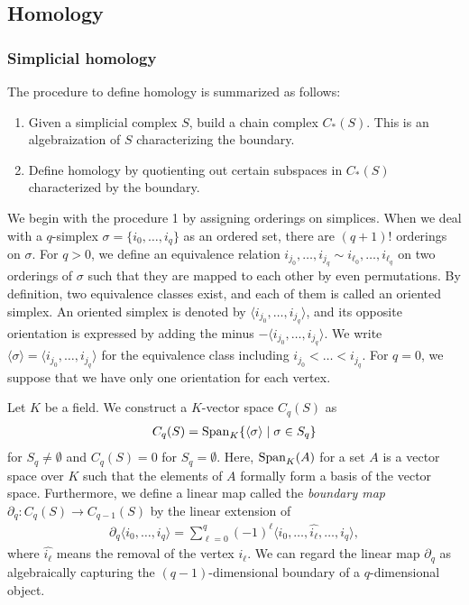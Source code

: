 \documentclass{article}
\begin{document}
\subsection{Homology}\label{sec:homology}
\subsubsection{Simplicial homology}\label{sec:simplicial_homology}
The procedure to define homology is summarized as follows:
\begin{enumerate}
\item Given a simplicial complex $S$, build a chain complex  $C_*(S)$. This is an algebraization of $S$ characterizing the boundary. 
\item Define homology by quotienting out  certain subspaces in $C_*(S)$ characterized by the boundary. 
\end{enumerate}

We begin with the procedure 1 by assigning orderings on simplices. 
When we deal with a $q$-simplex $\sigma=\{i_0,\dots,i_q\}$ as an ordered set, there are $(q+1)!$ orderings on $\sigma$.
For $q>0$, we define an equivalence relation $i_{j_0},\dots,i_{j_q}  \sim  i_{\ell_0},\dots,i_{\ell_q} $ on two orderings of $\sigma$ such that they are mapped to each other by even permutations. 
By definition, two equivalence classes exist, and each of them is called an oriented simplex. 
An oriented simplex is denoted by $\langle i_{j_0},\dots,i_{j_q} \rangle$, and its opposite orientation is expressed by adding the minus $-\langle i_{j_0},\dots,i_{j_q} \rangle$.
We write $\langle\sigma\rangle=\langle i_{j_0},\dots,i_{j_q} \rangle$ for the equivalence class including $i_{j_0}<\dots<i_{j_q}$. For $q=0$, we suppose that we have only one orientation for each vertex. 

Let $K$ be a field. We construct a $K$-vector space $C_q(S)$ as 
\begin{align*}
C_q(S)={\rm Span}_K\{\langle \sigma\rangle\mid \sigma \in S_q\}
\end{align*}
for $S_q\neq\emptyset$ and $C_q(S)=0$ for $S_q=\emptyset$.
Here, ${\rm Span}_K(A)$ for a set $A$ is a vector space over $K$ such that the elements of $A$ formally form a basis of the vector space.
Furthermore, we define a linear map called the {\em boundary map} $\partial_q: C_q(S)\rightarrow C_{q-1}(S)$ by the linear extension of 
\begin{align}\label{eq:boundary}
\partial_q\langle i_0,\dots,i_q\rangle=\sum_{\ell=0}^q(-1)^\ell\langle i_0,\dots,\widehat{i_\ell},\dots,i_q\rangle,
\end{align}
where $\widehat{i_\ell}$ means the removal of the vertex $i_\ell$. We can regard the linear map $\partial_q$ as algebraically capturing the $(q-1)$-dimensional boundary of a $q$-dimensional object. 
\end{document}
